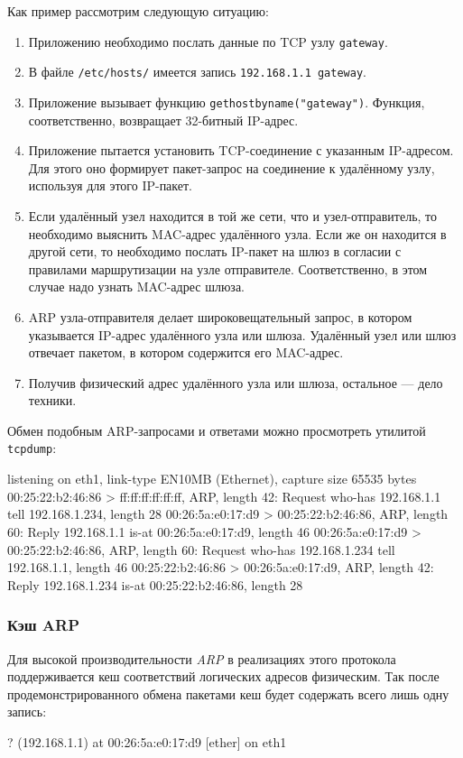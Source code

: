 Как пример рассмотрим следующую ситуацию:
\begin{enumerate}
  \item Приложению необходимо послать данные по TCP узлу \lstinline{gateway}.
  \item В файле \lstinline{/etc/hosts/} имеется запись \lstinline{192.168.1.1 gateway}.
  \item Приложение вызывает функцию \lstinline{gethostbyname("gateway")}. Функция, соответственно, возвращает 32-битный IP-адрес.
  \item Приложение пытается установить TCP-соединение с указанным IP-адресом. Для этого оно формирует пакет-запрос на соединение к удалённому узлу, используя для этого IP-пакет.
  \item Если удалённый узел находится в той же сети, что и узел-отправитель, то необходимо выяснить MAC-адрес удалённого узла. Если же он находится в другой сети, то необходимо послать IP-пакет на шлюз в согласии с правилами маршрутизации на узле отправителе. Соответственно, в этом случае надо узнать MAC-адрес шлюза.
  \item ARP узла-отправителя делает широковещательный запрос, в котором указывается IP-адрес удалённого узла или шлюза. Удалённый узел или шлюз отвечает пакетом, в котором содержится его MAC-адрес.
  \item Получив физический адрес удалённого узла или шлюза, остальное — дело техники.
\end{enumerate}

Обмен подобным ARP-запросами и ответами можно просмотреть утилитой \lstinline{tcpdump}:
\begin{plainlst}{}{}
listening on eth1, link-type EN10MB (Ethernet), capture size 65535 bytes
00:25:22:b2:46:86 > ff:ff:ff:ff:ff:ff, ARP, length 42: Request who-has 192.168.1.1 tell 192.168.1.234, length 28
00:26:5a:e0:17:d9 > 00:25:22:b2:46:86, ARP, length 60: Reply 192.168.1.1 is-at 00:26:5a:e0:17:d9, length 46
00:26:5a:e0:17:d9 > 00:25:22:b2:46:86, ARP, length 60: Request who-has 192.168.1.234 tell 192.168.1.1, length 46
00:25:22:b2:46:86 > 00:26:5a:e0:17:d9, ARP, length 42: Reply 192.168.1.234 is-at 00:25:22:b2:46:86, length 28
\end{plainlst}

\subsubsection{Кэш ARP}
Для высокой производительности \emph{ARP} в реализациях этого протокола поддерживается кеш соответствий логических адресов физическим. Так после продемонстрированного обмена пакетами кеш будет содержать всего лишь одну запись:
\begin{plainlst}{}{}
? (192.168.1.1) at 00:26:5a:e0:17:d9 [ether] on eth1
\end{plainlst}

